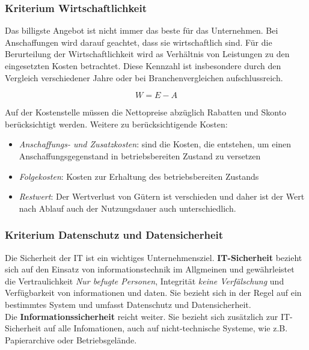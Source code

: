 \documentclass[a4paper, 12pt]{report}
\begin{document}
\subsubsection{Kriterium Wirtschaftlichkeit}

Das billigste Angebot ist nicht immer das beste für das Unternehmen. Bei 
Anschaffungen wird darauf geachtet, dass sie wirtschaftlich sind. Für die 
Berurteilung der Wirtschaftlichkeit wird as Verhältnis von Leistungen zu den 
eingesetzten Kosten betrachtet. Diese Kennzahl ist insbesondere durch den 
Vergleich verschiedener Jahre oder bei Branchenvergleichen aufschlussreich. 

\begin{center}
    \begin{equation}
        W = E - A
    \end{equation}
\end{center}

Auf der Kostenstelle müssen die Nettopreise abzüglich Rabatten und Skonto 
berücksichtigt werden. Weitere zu berücksichtigende Kosten: 

\begin{itemize}
    \item \emph{Anschaffungs- und Zusatzkosten}: sind die Kosten, die entstehen, 
        um einen Anschaffungsgegenstand in betriebsbereiten Zustand zu versetzen
    \item \emph{Folgekosten}: Kosten zur Erhaltung des betriebsbereiten Zustands
    \item \emph{Restwert}: Der Wertverlust von Gütern ist verschieden und daher 
        ist der Wert nach Ablauf auch der Nutzungsdauer auch unterschiedlich. 
\end{itemize}

\subsubsection{Kriterium Datenschutz und Datensicherheit}

Die Sicherheit der IT ist ein wichtiges Unternehmensziel. \textbf{IT-Sicherheit}
bezieht sich auf den Einsatz von informationstechnik im Allgmeinen und 
gewährleistet die Vertraulichkeit \emph{Nur befugte Personen}, Integrität 
\emph{keine Verfälschung} und Verfügbarkeit von informationen und daten. Sie 
bezieht sich in der Regel auf ein bestimmtes System und umfasst Datenschutz und 
Datensicherheit. \\

Die \textbf{Informationssicherheit} reicht weiter. Sie bezieht sich zusätzlich 
zur IT-Sicherheit auf alle Infomationen, auch auf nicht-technische Systeme, 
wie z.B. Papierarchive oder Betriebsgelände. \\
\end{document}

